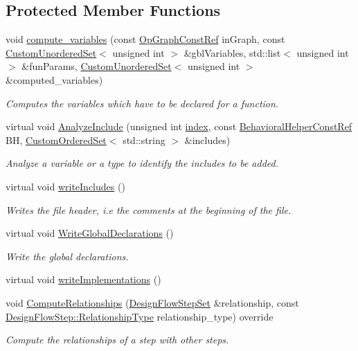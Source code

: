 \subsection*{Protected Member Functions}
\begin{DoxyCompactItemize}
\item 
void \hyperlink{classCBackend_abe204a588efad9a8205dc02097420473}{compute\+\_\+variables} (const \hyperlink{op__graph_8hpp_a9a0b240622c47584bee6951a6f5de746}{Op\+Graph\+Const\+Ref} in\+Graph, const \hyperlink{classCustomUnorderedSet}{Custom\+Unordered\+Set}$<$ unsigned int $>$ \&gbl\+Variables, std\+::list$<$ unsigned int $>$ \&fun\+Params, \hyperlink{classCustomUnorderedSet}{Custom\+Unordered\+Set}$<$ unsigned int $>$ \&computed\+\_\+variables)
\begin{DoxyCompactList}\small\item\em Computes the variables which have to be declared for a function. \end{DoxyCompactList}\item 
virtual void \hyperlink{classCBackend_a6f6d94270928c1a0b1100d79272daa2f}{Analyze\+Include} (unsigned int \hyperlink{tutorial__pact__2019_2Introduction_2third_2include_2Keccak_8h_a028c9bdc8344cca38ab522a337074797}{index}, const \hyperlink{behavioral__helper_8hpp_aae973b54cac87eef3b27442aa3e1e425}{Behavioral\+Helper\+Const\+Ref} BH, \hyperlink{classCustomOrderedSet}{Custom\+Ordered\+Set}$<$ std\+::string $>$ \&includes)
\begin{DoxyCompactList}\small\item\em Analyze a variable or a type to identify the includes to be added. \end{DoxyCompactList}\item 
virtual void \hyperlink{classCBackend_a4d3545310fee36bb8cfad7a893a8eb31}{write\+Includes} ()
\begin{DoxyCompactList}\small\item\em Writes the file header, i.\+e the comments at the beginning of the file. \end{DoxyCompactList}\item 
virtual void \hyperlink{classCBackend_abe2034d792eff87acf84b9212bae06c9}{Write\+Global\+Declarations} ()
\begin{DoxyCompactList}\small\item\em Write the global declarations. \end{DoxyCompactList}\item 
virtual void \hyperlink{classCBackend_aa3c46605226753185304ebc7b9adf463}{write\+Implementations} ()
\item 
void \hyperlink{classCBackend_a2acdf81972285d1505ad178769bf5d53}{Compute\+Relationships} (\hyperlink{classDesignFlowStepSet}{Design\+Flow\+Step\+Set} \&relationship, const \hyperlink{classDesignFlowStep_a723a3baf19ff2ceb77bc13e099d0b1b7}{Design\+Flow\+Step\+::\+Relationship\+Type} relationship\+\_\+type) override
\begin{DoxyCompactList}\small\item\em Compute the relationships of a step with other steps. \end{DoxyCompactList}\end{DoxyCompactItemize}
